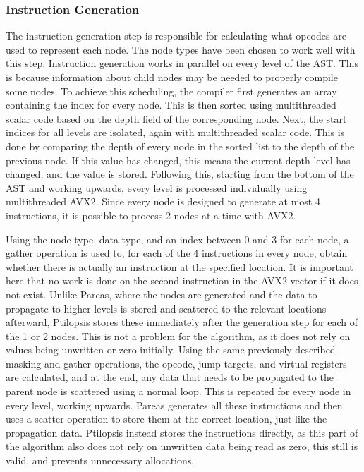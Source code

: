 \documentclass[11pt,dvipsnames]{article}
\begin{document}
\subsubsection{Instruction Generation}
The instruction generation step is responsible for calculating what opcodes are used to represent each node. The node types have been chosen to work well with this step. Instruction generation works in parallel on every level of the AST. This is because information about child nodes may be needed to properly compile some nodes. To achieve this scheduling, the compiler first generates an array containing the index for every node. This is then sorted using multithreaded scalar code based on the depth field of the corresponding node. Next, the start indices for all levels are isolated, again with multithreaded scalar code. This is done by comparing the depth of every node in the sorted list to the depth of the previous node. If this value has changed, this means the current depth level has changed, and the value is stored. Following this, starting from the bottom of the AST and working upwards, every level is processed individually using multithreaded AVX2. Since every node is designed to generate at most 4 instructions, it is possible to process 2 nodes at a time with AVX2.

Using the node type, data type, and an index between 0 and 3 for each node, a gather operation is used to, for each of the 4 instructions in every node, obtain whether there is actually an instruction at the specified location. It is important here that no work is done on the second instruction in the AVX2 vector if it does not exist. Unlike Pareas, where the nodes are generated and the data to propagate to higher levels is stored and scattered to the relevant locations afterward, Ptilopsis stores these immediately after the generation step for each of the 1 or 2 nodes. This is not a problem for the algorithm, as it does not rely on values being unwritten or zero initially. Using the same previously described masking and gather operations, the opcode, jump targets, and virtual registers are calculated, and at the end, any data that needs to be propagated to the parent node is scattered using a normal loop. This is repeated for every node in every level, working upwards. Pareas generates all these instructions and then uses a scatter operation to store them at the correct location, just like the propagation data. Ptilopsis instead stores the instructions directly, as this part of the algorithm also does not rely on unwritten data being read as zero, this still is valid, and prevents unnecessary allocations. 
\end{document}
